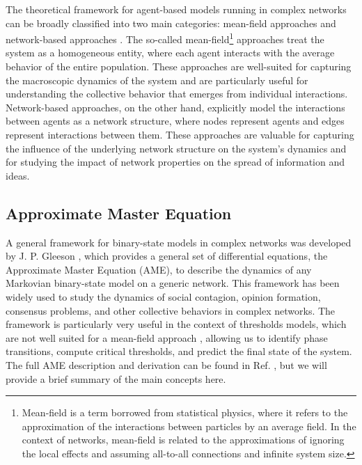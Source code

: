 The theoretical framework for agent-based models running in complex networks can be broadly classified into two main categories: mean-field approaches and network-based approaches \cite{barrat-2008}. The so-called mean-field\footnote{\sffamily\small Mean-field is a term borrowed from statistical physics, where it refers to the approximation of the interactions between particles by an average field. In the context of networks, mean-field is related to the approximations of ignoring the local effects and assuming all-to-all connections and infinite system size.} approaches treat the system as a homogeneous entity, where each agent interacts with the average behavior of the entire population. These approaches are well-suited for capturing the macroscopic dynamics of the system and are particularly useful for understanding the collective behavior that emerges from individual interactions. Network-based approaches, on the other hand, explicitly model the interactions between agents as a network structure, where nodes represent agents and edges represent interactions between them. These approaches are valuable for capturing the influence of the underlying network structure on the system's dynamics and for studying the impact of network properties on the spread of information and ideas.

\subsection{\label{sec:Approximate Master Equation} Approximate Master Equation}

A general framework for binary-state models in complex networks was developed by J. P. Gleeson \cite{gleeson-2011,gleeson-2013}, which provides a general set of differential equations, the Approximate Master Equation (AME), to describe the dynamics of any Markovian binary-state model on a generic network. This framework has been widely used to study the dynamics of social contagion, opinion formation, consensus problems, and other collective behaviors in complex networks. The framework is particularly very useful in the context of thresholds models, which are not well suited for a mean-field approach \cite{gleeson-2007}, allowing us to identify phase transitions, compute critical thresholds, and predict the final state of the system. The full AME description and derivation can be found in Ref. \cite{gleeson-2013}, but we will provide a brief summary of the main concepts here.

